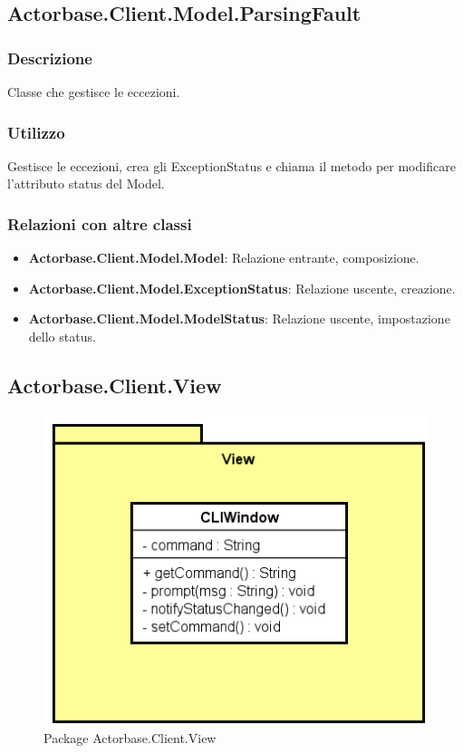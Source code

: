\documentclass[a4paper]{article}
\begin{document}
		\subsection{Actorbase.Client.Model.ParsingFault}
			\subsubsection{Descrizione}
				Classe che gestisce le eccezioni.
			\subsubsection{Utilizzo}
				Gestisce le eccezioni, crea gli ExceptionStatus e chiama il metodo per modificare l'attributo status del Model.
			\subsubsection{Relazioni con altre classi}
				\begin{itemize}
					\item \textbf{Actorbase.Client.Model.Model}: Relazione entrante, composizione.
					\item \textbf{Actorbase.Client.Model.ExceptionStatus}: Relazione uscente, creazione.
					\item \textbf{Actorbase.Client.Model.ModelStatus}: Relazione uscente, impostazione dello status.
				\end{itemize}
		
		\subsection{Actorbase.Client.View}
			\begin{figure} [H]
				\centering
				\includegraphics[scale=0.6]{ST/Client/ViewClasses.png}
   		     	\caption{Package Actorbase.Client.View}
			\end{figure}
			
\end{document}
